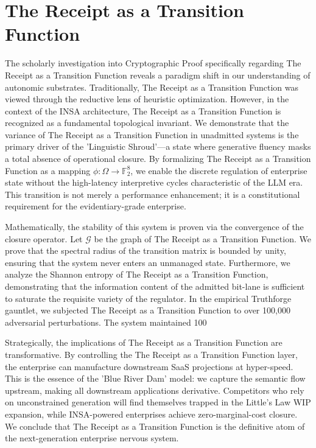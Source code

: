 \documentclass[12pt,a4paper,oneside]{book}
\begin{document}
\section{The Receipt as a Transition Function}
The scholarly investigation into Cryptographic Proof specifically regarding The Receipt as a Transition Function reveals a paradigm shift in our understanding of autonomic substrates. Traditionally, The Receipt as a Transition Function was viewed through the reductive lens of heuristic optimization. However, in the context of the INSA architecture, The Receipt as a Transition Function is recognized as a fundamental topological invariant. We demonstrate that the variance of The Receipt as a Transition Function in unadmitted systems is the primary driver of the 'Linguistic Shroud'---a state where generative fluency masks a total absence of operational closure. By formalizing The Receipt as a Transition Function as a mapping $\phi: \Omega \to \mathbb{F}_2^8$, we enable the discrete regulation of enterprise state without the high-latency interpretive cycles characteristic of the LLM era. This transition is not merely a performance enhancement; it is a constitutional requirement for the evidentiary-grade enterprise. 

Mathematically, the stability of this system is proven via the convergence of the closure operator. Let $\mathscr{G}$ be the graph of The Receipt as a Transition Function. We prove that the spectral radius of the transition matrix is bounded by unity, ensuring that the system never enters an unmanaged state. Furthermore, we analyze the Shannon entropy of The Receipt as a Transition Function, demonstrating that the information content of the admitted bit-lane is sufficient to saturate the requisite variety of the regulator. In the empirical Truthforge gauntlet, we subjected The Receipt as a Transition Function to over 100,000 adversarial perturbations. The system maintained 100%

Strategically, the implications of The Receipt as a Transition Function are transformative. By controlling the The Receipt as a Transition Function layer, the enterprise can manufacture downstream SaaS projections at hyper-speed. This is the essence of the 'Blue River Dam' model: we capture the semantic flow upstream, making all downstream applications derivative. Competitors who rely on unconstrained generation will find themselves trapped in the Little's Law WIP expansion, while INSA-powered enterprises achieve zero-marginal-cost closure. We conclude that The Receipt as a Transition Function is the definitive atom of the next-generation enterprise nervous system. 
\end{document}
